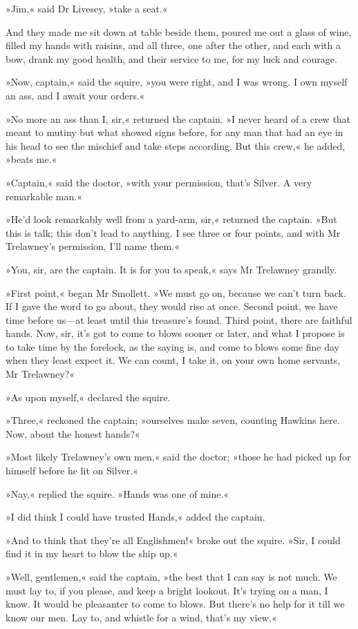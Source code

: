 »Jim,« said Dr Livesey, »take a seat.«

And they made me sit down at table beside them, poured me out a glass of wine, filled my hands with raisins, and all three, one after the other, and each with a bow, drank my good health, and their service to me, for my luck and courage.

»Now, captain,« said the squire, »you were right, and I was wrong. I own myself an ass, and I await your orders.«

»No more an ass than I, sir,« returned the captain. »I never heard of a crew that meant to mutiny but what showed signs before, for any man that had an eye in his head to see the mischief and take steps according. But this crew,« he added, »beats me.«

»Captain,« said the doctor, »with your permission, that's Silver. A very remarkable man.«

»He'd look remarkably well from a yard-arm, sir,« returned the captain. »But this is talk; this don't lead to anything. I see three or four points, and with Mr Trelawney's permission, I'll name them.«

»You, sir, are the captain. It is for you to speak,« says Mr Trelawney grandly.

»First point,« began Mr Smollett. »We must go on, because we can't turn back. If I gave the word to go about, they would rise at once. Second point, we have time before us—at least until this treasure's found. Third point, there are faithful hands. Now, sir, it's got to come to blows sooner or later, and what I propose is to take time by the forelock, as the saying is, and come to blows some fine day when they least expect it. We can count, I take it, on your own home servants, Mr Trelawney?«

»As upon myself,« declared the squire.

»Three,« reckoned the captain; »ourselves make seven, counting Hawkins here. Now, about the honest hands?«

»Most likely Trelawney's own men,« said the doctor; »those he had picked up for himself before he lit on Silver.«

»Nay,« replied the squire. »Hands was one of mine.«

»I did think I could have trusted Hands,« added the captain.

»And to think that they're all Englishmen!« broke out the squire. »Sir, I could find it in my heart to blow the ship up.«

»Well, gentlemen,« said the captain, »the best that I can say is not much. We must lay to, if you please, and keep a bright lookout. It's trying on a man, I know. It would be pleasanter to come to blows. But there's no help for it till we know our men. Lay to, and whistle for a wind, that's my view.«

